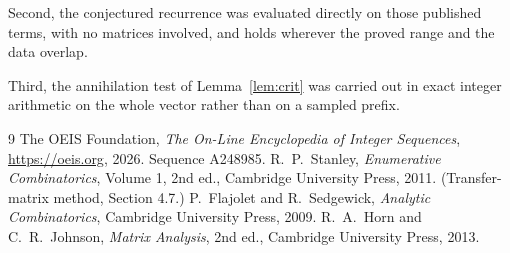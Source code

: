 \documentclass[11pt,a4paper]{article}
\theoremstyle{plain}
\theoremstyle{definition}
\begin{document}
Second, the conjectured recurrence was evaluated directly on those published terms, with no
matrices involved, and holds wherever the proved range and the data overlap.

Third, the annihilation test of Lemma~\ref{lem:crit} was carried out in exact integer
arithmetic on the whole vector rather than on a sampled prefix.

\begin{thebibliography}{9}
 The OEIS Foundation, \emph{The On-Line Encyclopedia of Integer
Sequences}, \url{https://oeis.org}, 2026. Sequence A248985.
 R.~P.~Stanley, \emph{Enumerative Combinatorics}, Volume 1, 2nd ed.,
Cambridge University Press, 2011. (Transfer-matrix method, Section 4.7.)
 P.~Flajolet and R.~Sedgewick, \emph{Analytic Combinatorics}, Cambridge
University Press, 2009.
 R.~A.~Horn and C.~R.~Johnson, \emph{Matrix Analysis}, 2nd ed., Cambridge
University Press, 2013.
\end{thebibliography}
\end{document}
